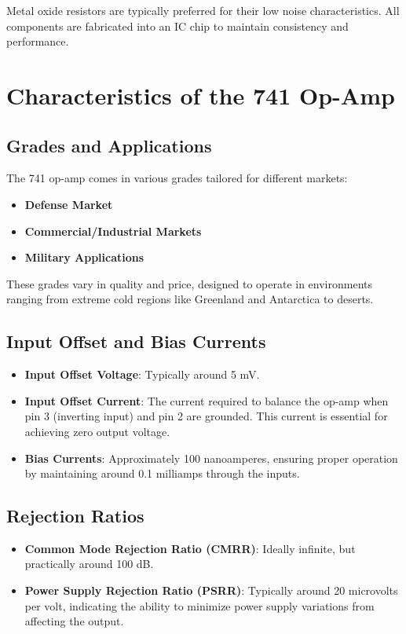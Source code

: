 Metal oxide resistors are typically preferred for their low noise characteristics. All components are fabricated into an IC chip to maintain consistency and performance.

\section{Characteristics of the 741 Op-Amp}

\subsection{Grades and Applications}

The 741 op-amp comes in various grades tailored for different markets:
\begin{itemize}
    \item \textbf{Defense Market}
    \item \textbf{Commercial/Industrial Markets}
    \item \textbf{Military Applications}
\end{itemize}

These grades vary in quality and price, designed to operate in environments ranging from extreme cold regions like Greenland and Antarctica to deserts.

\subsection{Input Offset and Bias Currents}

\begin{itemize}
    \item \textbf{Input Offset Voltage}: Typically around 5 mV.
    \item \textbf{Input Offset Current}: The current required to balance the op-amp when pin 3 (inverting input) and pin 2 are grounded. This current is essential for achieving zero output voltage.
    \item \textbf{Bias Currents}: Approximately 100 nanoamperes, ensuring proper operation by maintaining around 0.1 milliamps through the inputs.
\end{itemize}

\subsection{Rejection Ratios}

\begin{itemize}
    \item \textbf{Common Mode Rejection Ratio (CMRR)}: Ideally infinite, but practically around 100 dB.
    \item \textbf{Power Supply Rejection Ratio (PSRR)}: Typically around 20 microvolts per volt, indicating the ability to minimize power supply variations from affecting the output.
\end{itemize}

